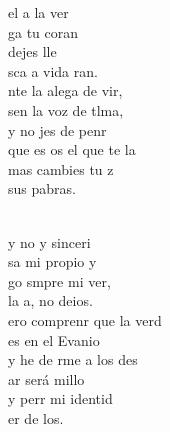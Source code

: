 \documentclass[12pt]{article}
\begin{document}
\begin{multicols*}{2}
\begin{cancion}%
	 el a la ver \\
	ga tu coran \\
	  dejes lle\\
	sca a vida ran. \\
	nte la alega de vir, \\
	sen la voz de tlma, \\
	y no jes de penr\\
	que es os el que te la\\
	mas  cambies tu z\\
	 sus pabras.\\\jump\\
	\begin{chorus}%
	y no y sinceri\\
	sa mi propio y\\
	go smpre mi ver,\\
	 la a, no deios.\\
	ero comprenr que la verd\\
	es en el Evanio \\
	y he de rme a los des \\
	ar será millo\\
	y perr mi identid\\
	er de los.\\
	\end{chorus}%
	\jump\\
\end{cancion}%


\end{multicols*}
\end{document}
